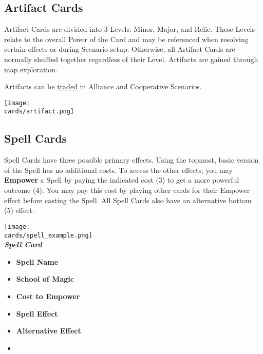 \begin{multicols*}{2}
\vspace*{\fill}

\columnbreak

\subsection*{Artifact Cards}
Artifact Cards are divided into 3 Levels: Minor, Major, and Relic.
These Levels relate to the overall Power of the Card and may be referenced when resolving certain effects or during Scenario setup.
Otherwise, all Artifact Cards are normally shuffled together regardless of their Level.
Artifacts are gained through map exploration.\par
Artifacts can be \hyperlink{Trading}{traded} in Alliance and Cooperative Scenarios.\par
\texttt{[image: \\cards/artifact.png]}

\subsection*{\hypertarget{spells}{Spell Cards}}

Spell Cards have three possible primary effects.
Using the topmost, basic version of the Spell has no additional costs.
To access the other effects, you may \textbf{Empower} a Spell by paying the indicated cost (3) to get a more powerful outcome (4).
You may pay this cost by playing other cards for their Empower  effect before casting the Spell.
All Spell Cards also have an alternative bottom (5)  effect.\par

\filbreak
\begin{center}
  \texttt{[image: \\cards/spell\_example.png]}\\
  \medskip
  \footnotesize{\textbf{\textit{\textcolor{darkcandyapplered}{Spell Card}}}}
  \scriptsize
  \begin{multicols}{2}
    \begin{itemize}[itemsep=5pt]
      \item[\textbf{1.}] \textbf{Spell Name}
      \item[\textbf{2.}] \textbf{School of Magic}
      \item[\textbf{3.}] \textbf{Cost to Empower}
      \item[\textbf{4.}] \textbf{Spell Effect}
      \item[\textbf{5.}] \textbf{Alternative Effect}
      \item[]
    \end{itemize}
  \end{multicols}
\end{center}


\end{multicols*}
